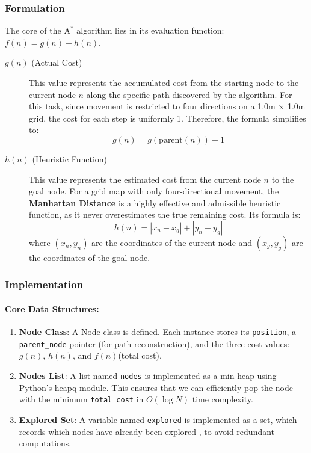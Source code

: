 \documentclass[aps,letterpaper,10pt]{revtex4}
\begin{document}
\subsubsection{Formulation}
The core of the A$^*$ algorithm lies in its evaluation function: $f(n) = g(n) + h(n)$.
\begin{description}
	\item[$g(n)$ (Actual Cost)] 
	This value represents the accumulated cost from the starting node to the current node $n$ along the specific path discovered by the algorithm. For this task, since movement is restricted to four directions on a 1.0m $\times$ 1.0m grid, the cost for each step is uniformly 1. Therefore, the formula simplifies to:
	$$g(n) = g(\text{parent}(n)) + 1$$
    \item[$h(n)$ (Heuristic Function)] This value represents the estimated cost from the current node $n$ to the goal node. For a grid map with only four-directional movement, the \textbf{Manhattan Distance} is a highly effective and admissible heuristic function, as it never overestimates the true remaining cost. Its formula is:
    $$h(n) = |x_n - x_g| + |y_n - y_g|$$
    where $(x_n, y_n)$ are the coordinates of the current node and $(x_g, y_g)$ are the coordinates of the goal node.
\end{description}


\subsubsection{Implementation}

\paragraph{Core Data Structures:}
	\begin{enumerate}
		\item \textbf{Node Class}: A Node class is defined. Each instance stores its \texttt{position}, a \texttt{parent\_node} pointer (for path reconstruction), and the three cost values: $g(n)$, $h(n)$, and $f(n)$(total cost).

		\item \textbf{Nodes List}: A list named \texttt{nodes} is implemented as a min-heap using Python's heapq module. This ensures that we can efficiently pop the node with the minimum \texttt{total\_cost} in $O(\log N)$ time complexity.

		\item \textbf{Explored Set}: A variable named \texttt{explored} is implemented as a set, which records which nodes have already been explored , to  avoid redundant computations.
	\end{enumerate}
\end{document}
